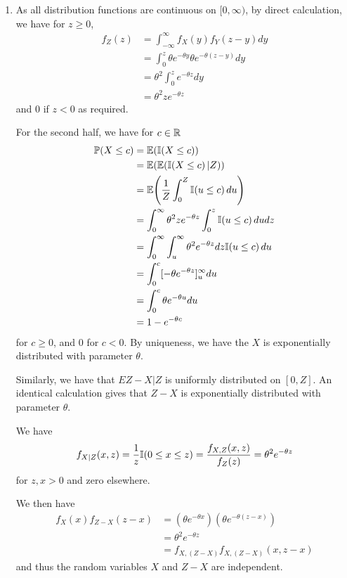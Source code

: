 \begin{enumerate}
\item As all distribution functions are continuous on $[0, \infty)$,
  by direct calculation, we have for $z \geq 0$,
  \begin{align}
    \label{eq:6}
    f_{Z}(z) &= \int_{-\infty}^{\infty} f_{X}(y) f_{Y}(z - y) dy \\
    &= \int_{0}^{z} \theta e^{-\theta y} \theta e^{-\theta(z - y)} dy
    \\
    &= \theta^{2} \int_{0}^{z} e^{-\theta z} dy \\
    &= \theta^{2} z e^{-\theta z}
  \end{align} and $0$ if $z < 0$ as required.

  For the second half, we have for $c \in \mathbb{R}$
  \begin{align}
    \label{eq:7}
    \Prob{X \leq c} &= \E{\I{X \leq c}} \\
    &= \E{\E{\I{X \leq c} |Z}} \\
    &= \E{\frac{1}{Z}\int_{0}^{Z}\I{u \leq c} du} \\
    &= \int_{0}^{\infty} \theta^{2} z e^{-\theta z} \int_{0}^{z} \I{u
      \leq c} du dz \\
    &= \int_{0}^{\infty} \int_{u}^{\infty} \theta^{2} e^{-\theta z} dz
    \I{u \leq c} du \\
    &= \int_{0}^{c} [-\theta e^{-\theta z}]_{u}^{\infty} du \\
    &= \int_{0}^{c} \theta e^{-\theta u} du \\
    &= 1 - e^{-\theta c}
  \end{align} for $c \geq 0$, and $0$ for $c < 0$. By uniqueness, we
  have the $X$ is exponentially distributed with parameter $\theta$.

  Similarly, we have that $E{Z - X | Z}$ is uniformly distributed on
  $[0, Z]$. An identical calculation gives that $Z - X$ is
  exponentially distributed with parameter $\theta$.

  We have
  \begin{align*}
    f_{X|Z}(x, z) = \frac{1}{z} \I{0 \leq x \leq z} = \frac{f_{X,Z}(x,
      z)}{f_{Z}(z)} = \theta^{2} e ^{-\theta z}
  \end{align*} for $z, x > 0$ and zero elsewhere.

  We then have
  \begin{align}
    \label{eq:9}
    f_{X}(x) f_{Z-X}(z-x) &= \left(\theta e^{-\theta x} \right)
    \left(\theta e^{-\theta (z -x)} \right) \\
    &= \theta^{2} e^{-\theta z} \\
    &= f_{X, (Z-X)} f_{X, (Z-X)}(x, z-x)
  \end{align} and thus the random variables $X$ and $Z-X$ are
  independent.


\end{enumerate}
